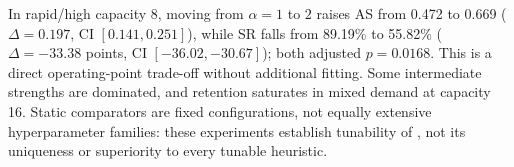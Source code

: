 In rapid/high capacity 8, moving from $\alpha=1$ to $2$ raises AS from 0.472 to 0.669 ($\Delta=0.197$, CI $[0.141,0.251]$), while SR falls from 89.19\% to 55.82\% ($\Delta=-33.38$ points, CI $[-36.02,-30.67]$); both adjusted $p=0.0168$. This is a direct operating-point trade-off without additional fitting. Some intermediate strengths are dominated, and retention saturates in mixed demand at capacity 16. Static comparators are fixed configurations, not equally extensive hyperparameter families: these experiments establish tunability of \ame, not its uniqueness or superiority to every tunable heuristic.
